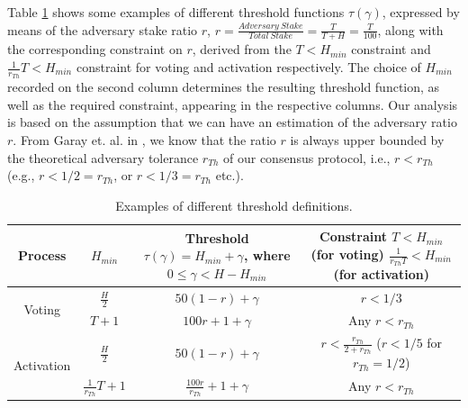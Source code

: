 Table \ref{table:threshold_examples} shows some examples of different 
threshold functions $\tau(\gamma)$, expressed by means of 
the adversary stake ratio $r$, $r = \frac{Adversary\ Stake}{Total\ Stake} = 
\frac{T}{T+H} = \frac{T}{100}$, along with the corresponding constraint on $r$, 
derived from the $T < H_{min}$ constraint and $\frac{1}{r_{Th}}T < H_{min}$ 
constraint for voting and activation respectively. The choice of $H_{min}$ 
recorded on the second column determines the resulting threshold function, as 
well as the required constraint, appearing in the respective columns. Our 
analysis is based on the assumption 
that we can have an estimation of the adversary ratio $r$. From Garay et. al. 
in \cite{sok}, we know that the 
ratio $r$ is always upper bounded by the 
theoretical 
adversary tolerance $r_{Th}$ of our consensus protocol, i.e., $r < r_{Th}$ 
(e.g., $r < 1/2 = 
r_{Th}$, or $r < 1/3 = r_{Th}$ etc.).

\begin{table}[h!]
	\centering
	\begin{tabular}{ | c | c | c | c |} 
		\hline
		\textbf{Process} & $H_{min}$ & \makecell[c]{\textbf{Threshold}\\ 
		$\tau(\gamma) = 
		H_{min} + \gamma$,\\ where $0 \leq \gamma < H-H_{min}$} & 
		\makecell[c]{\textbf{Constraint}\\$T < H_{min}$ (for voting)\\ 
		$\frac{1}{r_{Th}T} < H_{min}$ 
		(for activation)} \\ 
		\hline
		\multirow{2}{*}{Voting} & $\frac{H}{2}$ & 
		$50(1-r)+\gamma$ & $r < 1/3$
		 \\ 
		 & $T+1$ & $100r + 1 +\gamma$ & Any $r < r_{Th}$ \\ 
		\hline
		\multirow{2}{*}{Activation} & $\frac{H}{2}$ & 
		$50(1-r)+\gamma$ & 
		\makecell[c]{$r < \frac{r_{Th}}{2+r_{Th}}$ \\ ($r < 1/5$ for 
		$r_{Th} = 1/2$)}
		\\ 
		 & $\frac{1}{r_{Th}}T + 1$ & 
		$\frac{100r}{r_{Th}} + 1 + \gamma$ & Any $r < r_{Th}$ \\ 
		\hline
	\end{tabular}
	\caption{Examples of different threshold definitions.}
	\label{table:threshold_examples}
\end{table}

